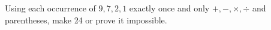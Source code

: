 Using each occurrence of $9,7,2,1$ exactly once and only $+,-,\times,\div$ and parentheses, make 24 or prove it impossible.
